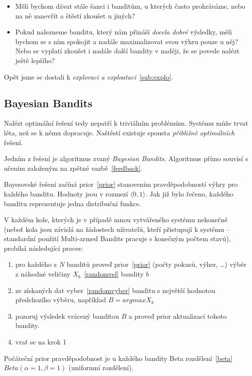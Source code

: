 \documentclass[thesis=M,czech]{FITthesis}[2014/05/07]
\begin{document}
\begin{itemize}
	\item Měli bychom dávat stále šanci i banditům, u kterých často prohráváme, nebo na ně zanevřít a štěstí zkoušet u jiných?
	\item Pokud nalezneme banditu, který nám přináší \emph{docela dobré} výsledky, měli bychom se s ním spokojit a nadále maximalizovat svou výhru pouze u něj? Nebo se vyplatí zkoušet i nadále další bandity v naději, že se povede nalézt ještě lepšího?
\end{itemize}

Opět jsme se dostali k \emph{exploraci a exploataci}~\ref{sub:explo}.	

\subsection{Bayesian Bandits}
\label{bayes}
Nalézt optimální řešení tedy nepatří k triviálním problémům. Systému může trvat léta, než se k němu dopracuje. Naštěstí existuje spousta \emph{přibližně optimálních} řešení.

Jedním z řešení je algoritmus zvaný \emph{Bayesian Bandits}. Algoritmus přímo souvisí s učením založeným na zpětné vazbě~\ref{feedback}.

Bayesovské řešení začíná prior~\ref{prior} stanovením pravděpodobností výhry pro každého banditu. Hodnoty jsou v rozmezí $\langle0,1\rangle$. Jak již bylo řečeno, každého banditu reprezentuje jedna distribuční funkce.

V každém kole, kterých je v případě mnou vytvářeného systému nekonečně (neboť kola jsou závislá na žádostech uživatelů, kteří přistupují k systému – standardní použití Multi-armed Bandits pracuje s konečným počtem stavů), probíhá následující proces:

\begin{enumerate}
	\item pro každého z $N$ banditů proveď prior~\ref{prior} (počty pokusů, výher, \ldots) výběr z náhodné veličiny $X_b$~\ref{randomvel} bandity $b$
	\item ze získaných dat vyber~\ref{randomvyber} banditu s největší hodnotou předchozího výběru, například $B = argmax X_b$	
	\item pozoruj výsledek vrácený banditou $B$ a proveď prior aktualizaci tohoto bandity.
	\item vrať se na krok 1
\end{enumerate}

Počáteční prior pravděpodobnost je u každého bandity Beta rozdělení~\ref{beta} ${Beta}(\alpha = 1, \beta = 1)$ (uniformní rozdělení).
\end{document}
